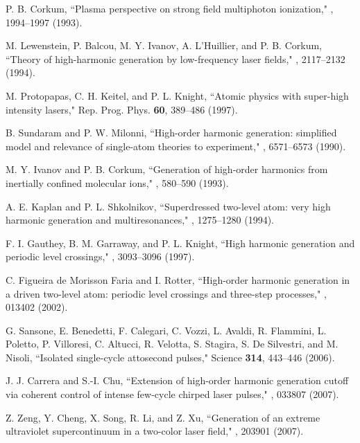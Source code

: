 \documentclass[10pt,letterpaper]{article}
\begin{document}
\begin{thebibliography}{99}
P. B. Corkum, ``Plasma perspective on strong field multiphoton ionization," , 1994--1997 (1993).

M. Lewenstein, P. Balcou, M. Y. Ivanov, A. L'Huillier, and P. B. Corkum, ``Theory of high-harmonic generation by low-frequency laser fields," , 2117--2132 (1994).

M. Protopapas, C. H. Keitel, and P. L. Knight, ``Atomic physics with super-high intensity lasers," Rep. Prog. Phys. {\bf 60}, 389--486 (1997).

B. Sundaram and P. W. Milonni, ``High-order harmonic generation: simplified model and relevance of single-atom theories to experiment," , 6571--6573 (1990).

M. Y. Ivanov and P. B. Corkum, ``Generation of high-order harmonics from inertially confined molecular ions," , 580--590 (1993).

A. E. Kaplan and P. L. Shkolnikov, ``Superdressed two-level atom: very high harmonic generation and multiresonances," , 1275--1280 (1994).

F. I. Gauthey, B. M. Garraway, and P. L. Knight, ``High harmonic generation and periodic level crossings," , 3093--3096 (1997).

C. Figueira de Morisson Faria and I. Rotter, ``High-order harmonic generation in a driven two-level atom: periodic level crossings and three-step processes," , 013402 (2002).

G. Sansone, E. Benedetti, F. Calegari, C. Vozzi, L. Avaldi, R. Flammini, L. Poletto, P. Villoresi, C. Altucci, R. Velotta, S. Stagira, S. De Silvestri, and M. Nisoli, ``Isolated single-cycle attosecond pulses," Science {\bf 314}, 443--446 (2006).

J. J. Carrera and S.-I. Chu, ``Extension of high-order harmonic generation cutoff via coherent control of intense few-cycle chirped laser pulses," , 033807 (2007).

Z. Zeng, Y. Cheng, X. Song, R. Li, and Z. Xu, ``Generation of an extreme ultraviolet supercontinuum in a two-color laser field," , 203901 (2007).


\end{thebibliography}
\end{document}
